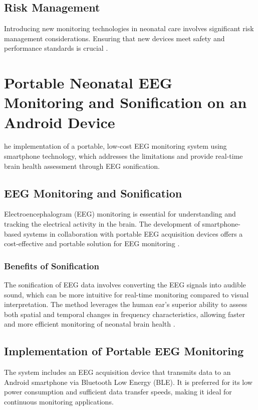 \documentclass[12pt,journal,compsoc]{IEEEtran}
\begin{document}
\subsection{Risk Management}
Introducing new monitoring technologies in neonatal care involves significant risk management considerations. Ensuring that new devices meet safety and performance standards is crucial \cite{IEEEhowto:nicklin}.

\section{Portable Neonatal EEG Monitoring and Sonification on an Android Device}
he implementation of a portable, low-cost EEG monitoring system using smartphone technology, which addresses the limitations and provide real-time brain health assessment through EEG sonification.

\subsection{EEG Monitoring and Sonification}
Electroencephalogram (EEG) monitoring is essential for understanding and tracking the electrical activity in the brain. The development of smartphone-based systems in collaboration with portable EEG acquisition devices offers a cost-effective and portable solution for EEG monitoring \cite{IEEEhowto:poveda}.

\subsubsection{Benefits of Sonification}
The sonification of EEG data involves converting the EEG signals into audible sound, which can be more intuitive for real-time monitoring compared to visual interpretation. The method leverages the human ear's superior ability to assess both spatial and temporal changes in frequency characteristics, allowing faster and more efficient monitoring of neonatal brain health \cite{IEEEhowto:poveda}.

\subsection{Implementation of Portable EEG Monitoring}
The system includes an EEG acquisition device that transmits data to an Android smartphone via Bluetooth Low Energy (BLE). It is preferred for its low power consumption and sufficient data transfer speeds, making it ideal for continuous monitoring applications.
\end{document}
